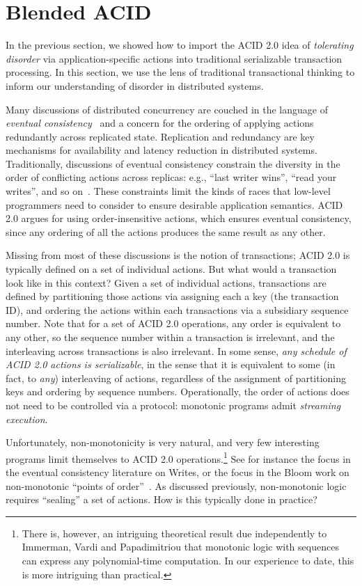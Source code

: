 \documentclass{sig-alternate}
\begin{document}
\section{Blended ACID}
In the previous section, we showed how to import the ACID 2.0 idea of
\emph{tolerating disorder} via application-specific actions into traditional
serializable transaction processing. In this section, we use the lens of
traditional transactional thinking to inform our understanding of disorder in
distributed systems.

Many discussions of distributed concurrency are couched in the language of
\emph{eventual consistency}~\cite{Terry1995} and a concern for the ordering of
applying actions redundantly across replicated state.  Replication and
redundancy are key mechanisms for availability and latency reduction in
distributed systems.  Traditionally, discussions of eventual consistency
constrain the diversity in the order of conflicting actions across replicas:
e.g., ``last writer wins'', ``read your writes'', and so on~\cite{Terry1994}.
These constraints limit the kinds of races that low-level programmers need to
consider to ensure desirable application semantics.  ACID 2.0 argues for using
order-insensitive actions, which ensures eventual consistency, since any
ordering of all the actions produces the same result as any other.

Missing from most of these discussions is the notion of transactions; ACID 2.0
is typically defined on a set of individual actions.  But what would a
transaction look like in this context?  Given a set of individual actions,
transactions are defined by partitioning those actions via assigning each a key
(the transaction ID), and ordering the actions within each transactions via a
subsidiary sequence number.  Note that for a set of ACID 2.0 operations, any
order is equivalent to any other, so the sequence number within a transaction is
irrelevant, and the interleaving across transactions is also irrelevant.  In
some sense, \emph{any schedule of ACID 2.0 actions is serializable}, in the
sense that it is equivalent to some (in fact, to \emph{any}) interleaving of
actions, regardless of the assignment of partitioning keys and ordering by
sequence numbers.  Operationally, the order of actions does not need to be
controlled via a protocol: monotonic programs admit \emph{streaming execution}.

Unfortunately, non-monotonicity is very natural, and very few interesting
programs limit themselves to ACID 2.0 operations.\footnote{There is, however, an
  intriguing theoretical result due independently to Immerman, Vardi and
  Papadimitriou that monotonic logic with sequences can express any
  polynomial-time computation.  In our experience to date, this is more
  intriguing than practical.}  See for instance the focus in the eventual
consistency literature on Writes, or the focus in the Bloom work on
non-monotonic ``points of order''~\cite{Alvaro2011}.  As discussed previously,
non-monotonic logic requires ``sealing'' a set of actions.  How is this
typically done in practice?
\end{document}
